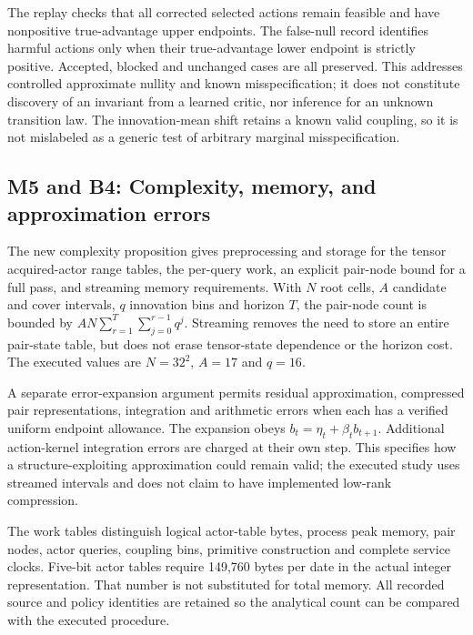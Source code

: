 \documentclass[ecta,nameyear,draft]{econsocart}
\begin{document}
The replay checks that all corrected selected actions remain feasible
and have nonpositive true-advantage upper endpoints. The false-null
record identifies harmful actions only when their true-advantage lower
endpoint is strictly positive. Accepted, blocked and unchanged cases are
all preserved. This addresses controlled approximate nullity and known
misspecification; it does not constitute discovery of an invariant from
a learned critic, nor inference for an unknown transition law. The
innovation-mean shift retains a known valid coupling, so it is not
mislabeled as a generic test of arbitrary marginal misspecification.

\hypertarget{m5-and-b4-complexity-memory-and-approximation-errors}{%
\subsection{M5 and B4: Complexity, memory, and approximation
errors}\label{m5-and-b4-complexity-memory-and-approximation-errors}}

The new complexity proposition gives preprocessing and storage for the
tensor acquired-actor range tables, the per-query work, an explicit
pair-node bound for a full pass, and streaming memory requirements. With
\(N\) root cells, \(A\) candidate and cover intervals, \(q\) innovation
bins and horizon \(T\), the pair-node count is bounded by
\(AN\sum_{r=1}^{T}\sum_{j=0}^{r-1}q^j\). Streaming removes the need to
store an entire pair-state table, but does not erase tensor-state
dependence or the horizon cost. The executed values are \(N=32^2\),
\(A=17\) and \(q=16\).

A separate error-expansion argument permits residual approximation,
compressed pair representations, integration and arithmetic errors when
each has a verified uniform endpoint allowance. The expansion obeys
\(b_t=\eta_t+\beta_tb_{t+1}\). Additional action-kernel integration
errors are charged at their own step. This specifies how a
structure-exploiting approximation could remain valid; the executed
study uses streamed intervals and does not claim to have implemented
low-rank compression.

The work tables distinguish logical actor-table bytes, process peak
memory, pair nodes, actor queries, coupling bins, primitive construction
and complete service clocks. Five-bit actor tables require 149,760 bytes
per date in the actual integer representation. That number is not
substituted for total memory. All recorded source and policy identities
are retained so the analytical count can be compared with the executed
procedure.
\end{document}

